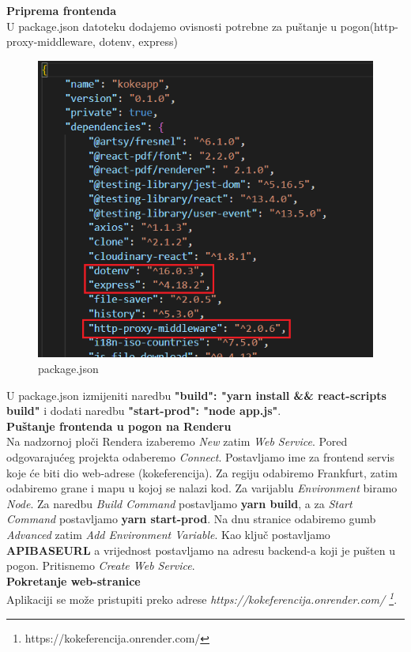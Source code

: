         \textbf{Priprema frontenda}\\
        U package.json datoteku dodajemo ovisnosti potrebne za puštanje u pogon(http-proxy-middleware, dotenv, express)
         \begin{figure}[H]
                 \includegraphics[scale = 0.70]{slike/package.json.png}
                \centering
                 \caption{package.json}
                 \label{fig:package.json}
                 \end{figure}
        U package.json izmijeniti naredbu \textbf{"build": "yarn install && react-scripts build"} i dodati naredbu \textbf{"start-prod": "node app.js"}.\\
        

        \textbf{Puštanje frontenda u pogon na Renderu}\\
             Na nadzornoj ploči Rendera izaberemo \textit{New} zatim \textit{Web Service}. Pored odgovarajućeg projekta odaberemo \textit{Connect}. Postavljamo ime za frontend servis koje će biti dio web-adrese (kokeferencija). Za regiju odabiremo Frankfurt, zatim odabiremo grane i mapu u kojoj se nalazi kod. Za varijablu \textit{Environment} biramo \textit{Node}. Za naredbu \textit{Build Command} postavljamo \textbf{yarn build}, a za \textit{Start Command} postavljamo \textbf{yarn start-prod}. Na dnu stranice odabiremo gumb \textit{Advanced} zatim \textit{Add Environment Variable}. Kao ključ postavljamo \textbf{APIBASEURL} a vrijednost postavljamo na adresu backend-a koji je pušten u pogon. Pritisnemo \textit{Create Web Service}. \\
        \textbf{Pokretanje web-stranice}\\
            Aplikaciji se može pristupiti preko adrese \textit{ https://kokeferencija.onrender.com/ \footnote{https://kokeferencija.onrender.com/}}.

    \eject 